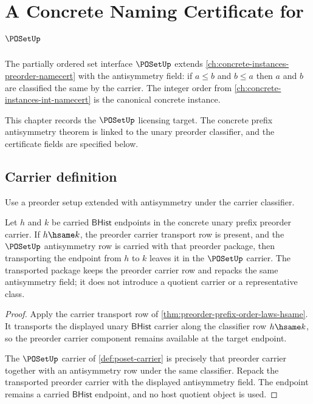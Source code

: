 \chapter{A Concrete Naming Certificate for $\POSetUp$}
\label{ch:concrete-instances-poset-namecert}

The partially ordered set interface $\POSetUp$ extends \autoref{ch:concrete-instances-preorder-namecert} with the antisymmetry field: if $a \le b$ and $b \le a$ then $a$ and $b$ are classified the same by the carrier. The integer order from \autoref{ch:concrete-instances-int-namecert} is the canonical concrete instance.

\begin{remark}
\label{rem:concrete-instances-poset-namecert-scope}
This chapter records the $\POSetUp$ licensing target. The concrete prefix
antisymmetry theorem is linked to the unary preorder classifier, and the
certificate fields are specified below.
\end{remark}

\section{Carrier definition}

\begin{definition}
\label{def:poset-carrier}
Use a preorder setup extended with antisymmetry under the carrier classifier.
\end{definition}

\begin{theorem}
\label{thm:poset-bhist-carrier-transport-obligation}
Let $h$ and $k$ be carried $\mathsf{BHist}$ endpoints in the concrete unary
prefix preorder carrier.  If $h\hsame k$, the preorder carrier transport row
is present, and the $\POSetUp$ antisymmetry row is carried with that preorder
package, then transporting the endpoint from $h$ to $k$ leaves it in the
$\POSetUp$ carrier.  The transported package keeps the preorder carrier row
and repacks the same antisymmetry field; it does not introduce a quotient
carrier or a representative class.
\end{theorem}
\begin{proof}
Apply the carrier transport row of
\autoref{thm:preorder-prefix-order-laws-hsame}.  It transports the displayed
unary $\mathsf{BHist}$ carrier along the classifier row $h\hsame k$, so the
preorder carrier component remains available at the target endpoint.

The $\POSetUp$ carrier of \autoref{def:poset-carrier} is precisely that
preorder carrier together with an antisymmetry row under the same classifier.
Repack the transported preorder carrier with the displayed antisymmetry field.
The endpoint remains a carried $\mathsf{BHist}$ endpoint, and no host quotient
object is used.
\end{proof}

